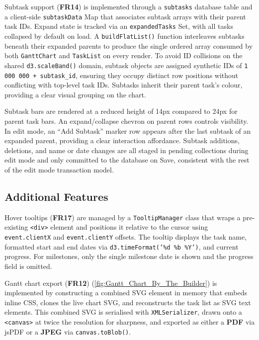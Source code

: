 \documentclass[12pt,nonacm,acmlarge,titlepage,screen]{acmart}
\begin{document}
Subtask support (\textbf{FR14}\label{fr:14-impl}) is implemented through a \texttt{subtasks}
database table and a client-side \texttt{subtaskData} Map that associates subtask arrays
with their parent task IDs. Expand state is tracked via an \texttt{expandedTasks} Set, with
all tasks collapsed by default on load. A \texttt{buildFlatList()} function interleaves
subtasks beneath their expanded parents to produce the single ordered array consumed by both
\texttt{GanttChart} and \texttt{TaskList} on every render. To avoid ID collisions on the
shared \texttt{d3.scaleBand()} domain, subtask objects are assigned synthetic IDs of
\texttt{1\,000\,000 + subtask\_id}, ensuring they occupy distinct row positions without
conflicting with top-level task IDs. Subtasks inherit their parent task's colour, providing
a clear visual grouping on the chart.

Subtask bars are rendered at a reduced height of 14px compared to 24px for parent task bars.
An expand/collapse chevron on parent rows controls visibility. In edit mode, an ``Add
Subtask'' marker row appears after the last subtask of an expanded parent, providing a clear
interaction affordance. Subtask additions, deletions, and name or date changes are all staged
in pending collections during edit mode and only committed to the database on Save,
consistent with the rest of the edit mode transaction model.

\subsection{Additional Features} \label{sec:impl_additional}

Hover tooltips (\textbf{FR17}\label{fr:17}) are managed by a \texttt{TooltipManager} class
that wraps a pre-existing \texttt{<div>} element and positions it relative to the cursor
using \texttt{event.clientX} and \texttt{event.clientY} offsets. The tooltip displays the
task name, formatted start and end dates via \texttt{d3.timeFormat('\%d \%b \%Y')}\cite{bostock_d3, geeksforgeeks_d3js_2025, w3schools_d3js_2025}, and
current progress. For milestones, only the single milestone date is shown and the progress
field is omitted.

Gantt chart export (\textbf{FR12}\label{fr:12}) (\cref{fig:Gantt_Chart_By_The_Builder}) is implemented by constructing a combined
SVG element in memory that embeds inline CSS, clones the live chart SVG, and reconstructs
the task list as SVG text elements. This combined SVG is serialised with
\texttt{XMLSerializer}, drawn onto a \texttt{<canvas>} at twice the resolution for
sharpness, and exported as either a \textbf{PDF} via jsPDF or a \textbf{JPEG} via
\texttt{canvas.toBlob()}.
\end{document}
